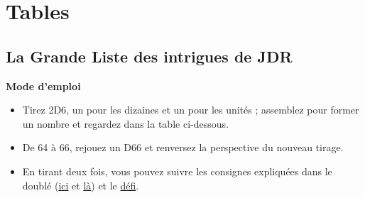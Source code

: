 \newpage

\section*{Tables}

\subsection*{La Grande Liste des intrigues de JDR}

\noindent \textbf{Mode d'emploi}
\begin{itemize}
\item Tirez 2D6, un pour les dizaines et un pour les unités ; assemblez pour former un nombre et regardez dans la table ci-dessous.
\item De 64 à 66, rejouez un D66 et renversez la perspective du nouveau tirage.
\item En tirant deux fois, vous pouvez suivre les consignes expliquées dans le doublé (\hyperlink{double1}{ici} et \hyperlink{double2}{là}) et le \hyperlink{defi}{défi}.
\end{itemize}

\vspace{0.3cm}


